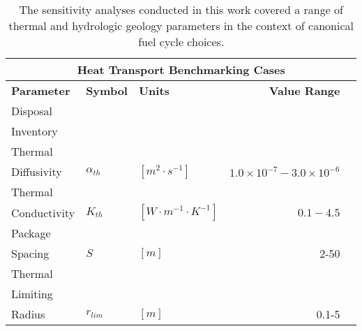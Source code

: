 \begin{table}[ht!]
\centering
\footnotesize{
\begin{tabular}{|l|l|l|r|r|}
\multicolumn{5}{c}{\textbf{Heat Transport Benchmarking Cases}}\\
\hline
\textbf{Parameter} & \textbf{Symbol} & \textbf{Units} & \textbf{Value Range} \\
\hline
Disposal& & & \\
Inventory& & & \\
\hline
Thermal & & & \\
Diffusivity & $\alpha_{th}$ & $[m^2\cdot s^{-1}]$ & $1.0\times10^{-7}-3.0\times10^{-6}$\\
\hline
Thermal & & & \\
Conductivity & $K_{th}$     & $[W\cdot m^{-1} \cdot K^{-1}]$ & $0.1 - 4.5$ \\
\hline
Package & & & \\
Spacing & $S$ & $[m]$ & 2-50 \\
\hline
Thermal & & & \\
Limiting & & & \\
Radius & $r_{lim}$ & $[m]$ & 0.1-5 \\
\end{tabular}
\caption{The sensitivity analyses conducted in this work covered a range of 
thermal and hydrologic geology parameters in the context of canonical fuel cycle choices.}
\label{tab:thermal_bench_tab}
}
\end{table}


